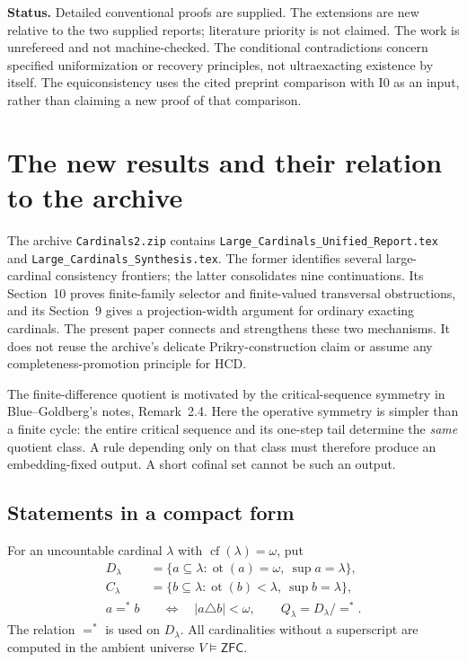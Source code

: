 \documentclass[11pt,letterpaper]{article}
\theoremstyle{definition}
\numberwithin{equation}{section}
\newcommand{\ZFC}{\mathsf{ZFC}}
\newcommand{\HCD}{\mathrm{HCD}}
\newcommand{\cf}{\operatorname{cf}}
\newcommand{\ot}{\operatorname{ot}}
\newcommand{\Izero}{\mathrm{I0}}
\newcommand{\Dlam}{D_\lambda}
\newcommand{\Qlam}{Q_\lambda}
\newcommand{\Clam}{C_\lambda}
\newcommand{\same}{\mathrel{=^{*}}}
\begin{document}
\textbf{Status.} Detailed conventional proofs are supplied. The extensions are new relative to the two supplied reports; literature priority is not claimed. The work is unrefereed and not machine-checked. The conditional contradictions concern specified uniformization or recovery principles, not ultraexacting existence by itself. The equiconsistency uses the cited preprint comparison with $\Izero$ as an input, rather than claiming a new proof of that comparison.

\newpage
\tableofcontents

\newpage
\section{The new results and their relation to the archive}\label{sec:results}

The archive \nolinkurl{Cardinals2.zip} contains \nolinkurl{Large_Cardinals_Unified_Report.tex} and \nolinkurl{Large_Cardinals_Synthesis.tex}. The former identifies several large-cardinal consistency frontiers; the latter consolidates nine continuations. Its Section~10 proves finite-family selector and finite-valued transversal obstructions, and its Section~9 gives a projection-width argument for ordinary exacting cardinals. The present paper connects and strengthens these two mechanisms. It does not reuse the archive's delicate Prikry-construction claim or assume any completeness-promotion principle for $\HCD$. \cite{archive}

The finite-difference quotient is motivated by the critical-sequence symmetry in Blue--Goldberg's notes, Remark~2.4. \cite{cover} Here the operative symmetry is simpler than a finite cycle: the entire critical sequence and its one-step tail determine the \emph{same} quotient class. A rule depending only on that class must therefore produce an embedding-fixed output. A short cofinal set cannot be such an output.

\subsection{Statements in a compact form}

For an uncountable cardinal $\lambda$ with $\cf(\lambda)=\omega$, put
\begin{align}
\Dlam&=\{a\subseteq\lambda:\ot(a)=\omega,\ \sup a=\lambda\},\\
\Clam&=\{b\subseteq\lambda:\ot(b)<\lambda,\ \sup b=\lambda\},\\
a\same b&\quad\Longleftrightarrow\quad |a\triangle b|<\omega,
\qquad \Qlam=\Dlam/{=^{*}}.
\end{align}
The relation $=^{*}$ is used on $D_\lambda$. All cardinalities without a superscript are computed in the ambient universe $V\models\ZFC$.
\end{document}
